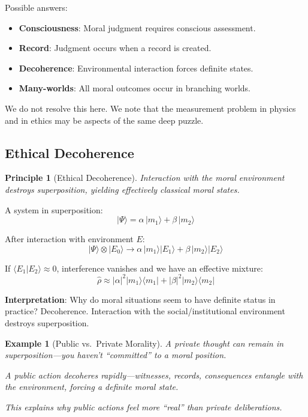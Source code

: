 \documentclass[12pt]{article}
\newtheorem{principle}{Principle}
\newtheorem{example}{Example}[section]
\begin{document}
Possible answers:
\begin{itemize}
    \item \textbf{Consciousness}: Moral judgment requires conscious assessment.
    \item \textbf{Record}: Judgment occurs when a record is created.
    \item \textbf{Decoherence}: Environmental interaction forces definite states.
    \item \textbf{Many-worlds}: All moral outcomes occur in branching worlds.
\end{itemize}

We do not resolve this here. We note that the measurement problem in physics and in ethics may be aspects of the same deep puzzle.

\subsection{Ethical Decoherence}

\begin{principle}[Ethical Decoherence]
\emph{Interaction with the moral environment destroys superposition, yielding effectively classical moral states.}
\end{principle}

A system in superposition:
\begin{equation}
    |\Psi\rangle = \alpha \,|m_1\rangle + \beta \,|m_2\rangle
\end{equation}

After interaction with environment $E$:
\begin{equation}
    |\Psi\rangle \otimes |E_0\rangle \to \alpha \,|m_1\rangle |E_1\rangle + \beta \,|m_2\rangle |E_2\rangle
\end{equation}

If $\langle E_1 | E_2 \rangle \approx 0$, interference vanishes and we have an effective mixture:
\begin{equation}
    \hat{\rho} \approx |\alpha|^2 |m_1\rangle \langle m_1| + |\beta|^2 |m_2\rangle \langle m_2|
\end{equation}

\textbf{Interpretation}: Why do moral situations seem to have definite status in practice? Decoherence. Interaction with the social/institutional environment destroys superposition.

\begin{example}[Public vs.\ Private Morality]
A private thought can remain in superposition---you haven't ``committed'' to a moral position.

A public action decoheres rapidly---witnesses, records, consequences entangle with the environment, forcing a definite moral state.

This explains why public actions feel more ``real'' than private deliberations.
\end{example}
\end{document}
